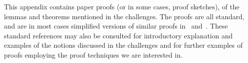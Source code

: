 \long{}
\newenvironment{metanote}{\begin{quote}\message{note!}[\begingroup\it}%
                         {\endgroup]\end{quote}}
\long{}

This appendix contains paper proofs (or in some cases, proof sketches), of the lemmas and theorems mentioned in the challenges.
The proofs are all standard, and are in most cases simplified versions of similar proofs in~\cite{picalcbook} and~\cite{Vasconcelos2012}.
These standard references may also be consulted for introductory explanation and examples of the notions discussed in the challenges and for further examples of proofs employing the proof techniques we are interested in.



